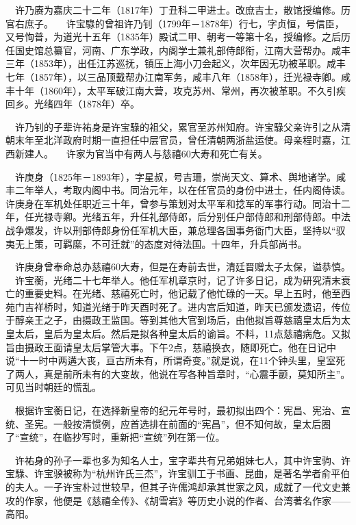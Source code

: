 \documentclass[a4paper,AutoFakeBold,oneside,12pt]{article}
\begin{document}
$\quad$许乃赓为嘉庆二十二年（1817年）丁丑科二甲进士。改庶吉士，散馆授编修。历官右庶子。
	$\quad$许宝騄的曾祖许乃钊（1799年－1878年）行七，字贞恒，号信臣，又号恂普，为道光十五年（1835年）殿试二甲、朝考一等第十名，授编修。之后历任国史馆总纂官，河南、广东学政，内阁学士兼礼部侍郎衔，江南大营帮办。咸丰三年（1853年），出任江苏巡抚，镇压上海小刀会起义，次年因无功被革职。咸丰七年（1857年），以三品顶戴帮办江南军务，咸丰八年（1858年），迁光禄寺卿。咸丰十年（1860年），太平军破江南大营，攻克苏州、常州，再次被革职。不久引疾回乡。光绪四年（1878年）卒。

$\quad$许乃钊的子辈许祐身是许宝騄的祖父，累官至苏州知府。许宝騄父亲许引之从清朝末年至北洋政府时期一直担任中层官员，曾任清朝两浙盐运使。母亲程时嘉，江西新建人。
	$\quad$许家为官当中有两人与慈禧60大寿和死亡有关。

$\quad$许庚身（1825年－1893年），字星叔，号吉珊，崇尚天文、算术、舆地诸学。咸丰二年举人，考取内阁中书。同治元年，以在任官员的身份中进士，任内阁侍读。许庚身在军机处任职近三十年，曾参与策划对太平军和捻军的军事行动。同治十二年，任光禄寺卿。光绪五年，升任礼部侍郎，后分别任户部侍郎和刑部侍郎。中法战争爆发，许以刑部侍郎身份任军机大臣，兼总理各国事务衙门大臣，坚持以“驭夷无上策，可羁縻，不可迁就”的态度对待法国。十四年，升兵部尚书。

$\quad$许庚身曾奉命总办慈禧60大寿，但是在寿前去世，清廷晋赠太子太保，谥恭慎。
	$\quad$许宝蘅，光绪二十七年举人。他任军机章京时，记了许多日记，成为研究清末衰亡的重要史料。在光绪、慈禧死亡时，他记载了他忙碌的一天。早上五时，他至西苑门吉祥桥时，知道光绪于昨天酉时死了。进内宫后知道，昨天已颁发遗诏，传位于醇亲王之子，由摄政王监国。等到其他大官到场后，由他拟旨尊慈禧皇太后为太皇太后，皇后为皇太后。然后是拟各种皇太后的谕旨。不料，11点慈禧病危。又拟旨由摄政王面请皇太后掌管大事。下午2点，慈禧换衣，随即死亡。他在日记中说“十一时中两遘大丧，亘古所未有，所谓奇变。”就是说，在11个钟头里，皇室死了两人，真是前所未有的大变故，他说在写各种旨章时，“心震手颤，莫知所主”。可见当时朝廷的慌乱。 

$\quad$根据许宝蘅日记，在选择新皇帝的纪元年号时，最初拟出四个：宪昌、宪治、宣统、圣宪。一般按清惯例，应首选排在前面的“宪昌”，但不知何故，皇太后圈了“宣统”，在临抄写时，重新把“宣统”列在第一位。	

	$\quad$许祐身的孙子一辈也多为知名人士，宝字辈共有兄弟姐妹七人，其中许宝驹、许宝騄、许宝骙被称为“杭州许氏三杰”，许宝驯工于书画、昆曲，是著名学者俞平伯的夫人。一子许宝朴过世较早，但其子许儒鸿却承其世家之风，成就了一代文史兼攻的作家，他便是《慈禧全传》、《胡雪岩》等历史小说的作者、台湾著名作家——高阳。
\end{document}
